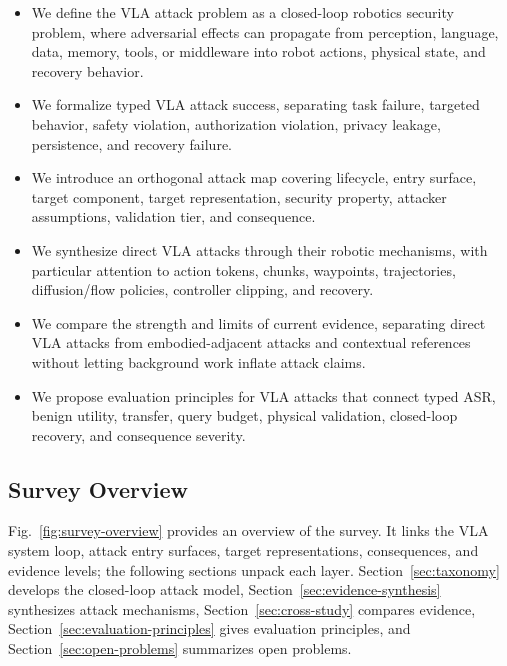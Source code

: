 \begin{itemize}
    \item We define the VLA attack problem as a closed-loop robotics security problem, where adversarial effects can propagate from perception, language, data, memory, tools, or middleware into robot actions, physical state, and recovery behavior.
    \item We formalize typed VLA attack success, separating task failure, targeted behavior, safety violation, authorization violation, privacy leakage, persistence, and recovery failure.
    \item We introduce an orthogonal attack map covering lifecycle, entry surface, target component, target representation, security property, attacker assumptions, validation tier, and consequence.
    \item We synthesize direct VLA attacks through their robotic mechanisms, with particular attention to action tokens, chunks, waypoints, trajectories, diffusion/flow policies, controller clipping, and recovery.
    \item We compare the strength and limits of current evidence, separating direct VLA attacks from embodied-adjacent attacks and contextual references without letting background work inflate attack claims.
    \item We propose evaluation principles for VLA attacks that connect typed ASR, benign utility, transfer, query budget, physical validation, closed-loop recovery, and consequence severity.
\end{itemize}

\subsection{Survey Overview}

Fig.~\ref{fig:survey-overview} provides an overview of the survey. It links the VLA system loop, attack entry surfaces, target representations, consequences, and evidence levels; the following sections unpack each layer. Section~\ref{sec:taxonomy} develops the closed-loop attack model, Section~\ref{sec:evidence-synthesis} synthesizes attack mechanisms, Section~\ref{sec:cross-study} compares evidence, Section~\ref{sec:evaluation-principles} gives evaluation principles, and Section~\ref{sec:open-problems} summarizes open problems.

